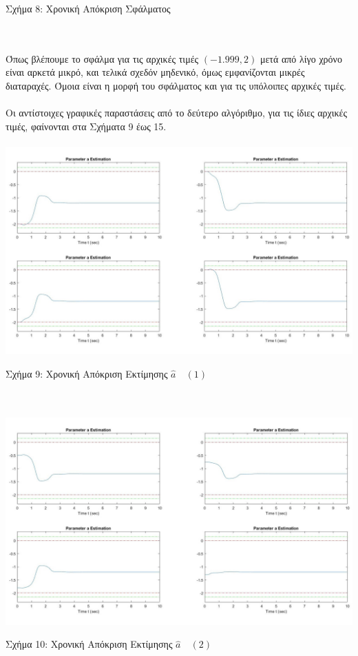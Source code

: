 \documentclass[12pt]{article}
\begin{document}
\centerline{Σχήμα 8: Χρονική Απόκριση Σφάλματος}
\\ \\
Όπως βλέπουμε το σφάλμα για τις αρχικές τιμές $(-1.999,2)$ μετά από λίγο χρόνο είναι αρκετά μικρό, και τελικά σχεδόν μηδενικό, όμως εμφανίζονται μικρές διαταραχές. Όμοια είναι η μορφή του σφάλματος και για τις υπόλοιπες αρχικές τιμές.
\\ \\
Οι αντίστοιχες γραφικές παραστάσεις από το δεύτερο αλγόριθμο, για τις ίδιες αρχικές τιμές, φαίνονται στα Σχήματα 9 έως 15.
\\ \\
\includegraphics[width=\linewidth]{a_est_b1.jpg}
\centerline{Σχήμα 9:  Χρονική Απόκριση Εκτίμησης $\hat{a} \quad (1)$}
\\ \\
\includegraphics[width=\linewidth]{a_est_b2.jpg}
\centerline{Σχήμα 10:  Χρονική Απόκριση Εκτίμησης $\hat{a} \quad (2)$}
\\ \\
\end{document}

